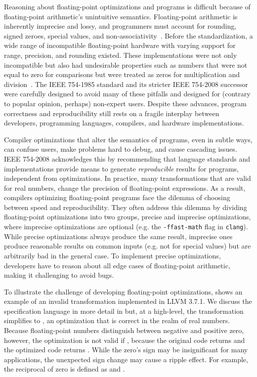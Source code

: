 \documentclass[preprint, numbers]{sigplanconf}
\begin{document}
Reasoning about floating-point optimizations and programs is difficult because
of floating-point arithmetic's unintuitive semantics. Floating-point arithmetic
is inherently imprecise and lossy, and programmers must account for rounding,
signed zeroes, special values, and non-associativity~\cite{goldberg1991every}.
Before the standardization, a wide range of incompatible floating-point
hardware with varying support for range, precision, and rounding existed. These
implementations were not only incompatible but also had undesirable properties
such as numbers that were not equal to zero for comparisons but were treated as
zeros for multiplication and division~\cite{severance1998interview}. The IEEE
754-1985 standard and its stricter IEEE 754-2008 successor were carefully
designed to avoid many of these pitfalls and designed for (contrary to popular
opinion, perhaps) non-expert users. Despite these advances, program correctness
and reproducibility still rests on a fragile interplay between developers,
programming languages, compilers, and hardware implementations.

Compiler optimizations that alter the semantics of programs, even in subtle
ways, can confuse users, make problems hard to debug, and cause cascading
issues. IEEE 754-2008 acknowledges this by recommending that language standards
and implementations provide means to generate \textit{reproducible} results for
programs, independent from optimizations. In practice, many transformations
that are valid for real numbers, change the precision of floating-point
expressions. As a result, compilers optimizing floating-point programs face the
dilemma of choosing between speed and reproducibility. They often address this
dilemma by dividing floating-point optimizations into two groups, precise and
imprecise optimizations, where imprecise optimizations are optional (e.g. the
\texttt{-ffast-math} flag in \texttt{clang}). While precise optimizations
always produce the same result, imprecise ones produce reasonable results on
common inputs (e.g. not for special values) but are arbitrarily bad in the
general case. To implement precise optimizations, developers have to reason
about all edge cases of floating-point arithmetic, making it challenging to
avoid bugs.

To illustrate the challenge of developing floating-point optimizations,
 shows an example of an invalid transformation implemented in
LLVM 3.7.1. We discuss the specification language in more detail in
 but, at a high-level, the transformation simplifies  to , an optimization that is correct in the realm of real
numbers. Because floating-point numbers distinguish between negative and
positive zero, however, the optimization is not valid if , because
the original code returns  and the optimized code returns . While
the zero's sign may be insignificant for many applications, the unexpected sign
change may cause a ripple effect. For example, the reciprocal of zero is
defined as  and .
\end{document}
